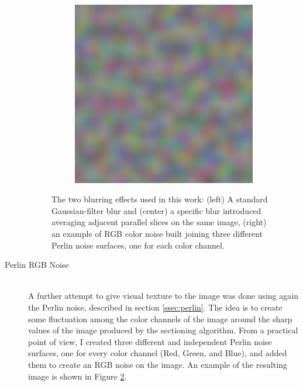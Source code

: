 \begin{description}
\begin{figure}
\begin{subfigure}[t]{0.3\textwidth}
                 \caption{}
                 \label{fig:av_blur}
            \end{subfigure}
            \quad
            \begin{subfigure}[t]{0.3\textwidth}
                 \centering
                 \includegraphics[width = \textwidth]{images/rgb_prlin}
                 \caption{}
                 \label{fig:rgb_prlin}
            \end{subfigure}

            \caption{The two blurring effects used in this work: (left) A standard Gaussian-filter blur and (center) a specific blur introduced averaging adjacent parallel slices on the same image, (right) an example of RGB color noise built joining three different Perlin noise surfaces, one for each color channel.}
            \label{fig:blur_effect}
        \end{figure}

        \item [Perlin RGB Noise] \hfill \\
        A further attempt to give visual texture to the image was done using again the Perlin noise, described in section \ref{ssec:perlin}. The idea is to create some fluctuation among the color channels of the image around the sharp values of the image produced by the sectioning algorithm.
        From a practical point of view, I created three different and independent Perlin noise surfaces, one for every color channel (Red, Green, and Blue), and added them to create an RGB noise on the image. An example of the resulting image is shown in Figure \ref{fig:rgb_prlin}.


\end{description}
